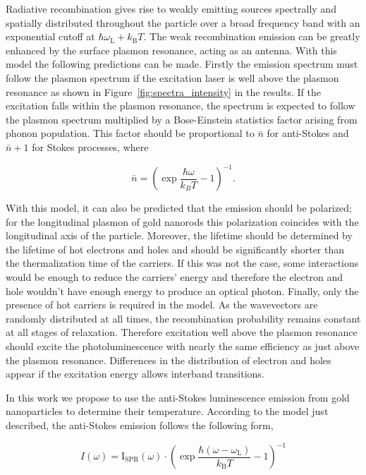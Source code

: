 Radiative recombination gives rise to weakly emitting sources spectrally and
spatially distributed throughout the particle over a broad frequency band with
an exponential cutoff at $\hbar\omega_\textrm{L}+k_\textrm{B}T$. The weak
recombination emission can be greatly enhanced by the surface plasmon resonance,
acting as an antenna. With this model the following predictions can be made.
Firstly the emission spectrum must follow the plasmon spectrum if the excitation
laser is well above the plasmon resonance as shown in \mbox{Figure
\ref{fig:spectra_intensity}} in the results. If the excitation falls within the
plasmon resonance, the spectrum is expected to follow the plasmon spectrum
multiplied by a Bose-Einstein statistics factor arising from phonon population.
This factor should be proportional to $\bar{n}$ for anti-Stokes and $\bar{n}+1$
for Stokes processes, where

\begin{equation}
	\bar{n}=\left(\exp\frac{\hbar\omega}{k_BT}-1\right)^{-1}.
\end{equation}

With this model, it can also be predicted that the emission should be polarized;
for the longitudinal plasmon of gold nanorods this polarization coincides with
the longitudinal axis of the particle\cite{He2015}. Moreover, the lifetime
should be determined by the lifetime of hot electrons and holes and should be
significantly shorter than the thermalization time of the carriers. If this was
not the case, some interactions would be enough to reduce the carriers' energy
and therefore the electron and hole wouldn't have enough energy to produce an
optical photon. Finally, only the presence of hot carriers is required in the
model. As the wavevectors are randomly distributed at all times, the
recombination probability remains constant at all stages of relaxation.
Therefore excitation well above the plasmon resonance should excite the
photoluminescence with nearly the same efficiency as just above the plasmon
resonance\cite{Cheng2015}. Differences in the distribution of electron and holes
appear if the excitation energy allows interband
transitions\cite{Sundararaman2014,Brown2016}. 

In this work we propose to use the anti-Stokes luminescence emission from gold
nanoparticles to determine their temperature. According to the model just
described, the anti-Stokes emission follows the following form,

\begin{equation}\label{eqn:fitting}
	I(\omega) =
	\textrm{I}_{\textrm{SPR}}(\omega)\cdot\left(\exp\frac{\hbar(\omega-\omega_\textrm{L})}{k_\textrm{B}T}-1\right)^{-1}
\end{equation}


